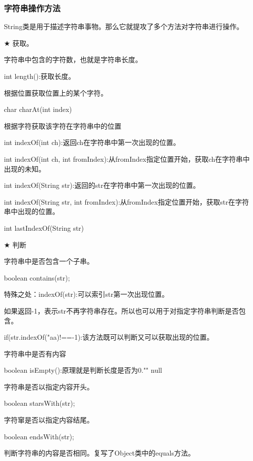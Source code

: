 \documentclass[UTF8]{ctexart}
\begin{document}

\subsubsection{字符串操作方法}

String类是用于描述字符串事物。那么它就提攻了多个方法对字符串进行操作。

$\bigstar$  获取。

\qquad \textbullet  字符串中包含的字符数，也就是字符串长度。

\qquad \quad int length():获取长度。

\qquad \textbullet  根据位置获取位置上的某个字符。

\qquad \quad char charAt(int index)

\qquad \textbullet  根据字符获取该字符在字符串中的位置

\qquad \quad int indexOf(int ch):返回ch在字符串中第一次出现的位置。

\qquad \quad int indexOf(int ch, int fromIndex):从fromIndex指定位置开始，获取ch在字符串中出现的未知。

\qquad \quad int indexOf(String str):返回的str在字符串中第一次出现的位置。

\qquad \quad int indexOf(String str, int fromIndex):从fromIndex指定位置开始，获取str在字符串中出现的位置。

\qquad \quad int lastIndexOf(String str)

$\bigstar$ 判断

\qquad \textbullet 字符串中是否包含一个子串。

\qquad \quad boolean contains(str);

\qquad \quad 特殊之处：indexOf(str):可以索引str第一次出现位置。

\qquad \quad 如果返回-1，表示str不再字符串存在。所以也可以用于对指定字符串判断是否包含。

\qquad \quad if(str.indexOf("aa)!==-1):该方法既可以判断又可以获取出现的位置。

\qquad \textbullet 字符串中是否有内容

\qquad \quad boolean isEmpty():原理就是判断长度是否为0."" null

\qquad \textbullet 字符串是否以指定内容开头。

\qquad \quad boolean starsWith(str);

\qquad \textbullet 字符窜是否以指定内容结尾。

\qquad \quad boolean endsWith(str);

\qquad \textbullet 判断字符串的内容是否相同。复写了Object类中的equals方法。
\end{document}
